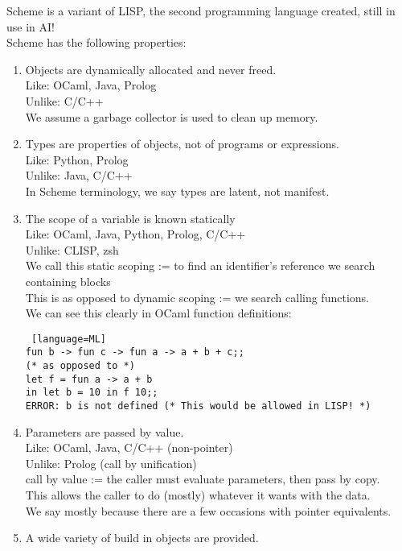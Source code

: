 \documentclass[../../lecture_notes.tex]{subfiles}
\begin{document}
\noindent Scheme is a variant of LISP, the second programming language created, still in use in AI!\\
Scheme has the following properties:
\begin{enumerate}
	\item Objects are dynamically allocated and never freed.\\
		Like: OCaml, Java, Prolog\\
		Unlike: C/C++\\
		We assume a garbage collector is used to clean up memory.
	\item Types are properties of objects, not of programs or expressions.\\
 		Like: Python, Prolog\\
 		Unlike: Java, C/C++\\
		In Scheme terminology, we say types are latent, not manifest.\\
	\item The scope of a variable is known statically\\
		Like: OCaml, Java, Python, Prolog, C/C++\\
		Unlike: CLISP, zsh\\
		We call this static scoping := to find an identifier’s reference we search containing blocks\\
		This is as opposed to dynamic scoping := we search calling functions.\\
		We can see this clearly in OCaml function definitions:\\
		\begin{lstlisting} [language=ML]
fun b -> fun c -> fun a -> a + b + c;;
(* as opposed to *)
let f = fun a -> a + b
in let b = 10 in f 10;; 
ERROR: b is not defined (* This would be allowed in LISP! *)
		\end{lstlisting}
	\item Parameters are passed by value.\\
		Like: OCaml, Java, C/C++ (non-pointer)\\
		Unlike: Prolog (call by unification)\\
		call by value := the caller must evaluate parameters, then pass by copy.\\
		This allows the caller to do (mostly) whatever it wants with the data.\\
		We say mostly because there are a few occasions with pointer equivalents.
	\item A wide variety of build in objects are provided.\\

\end{enumerate}
\end{document}
